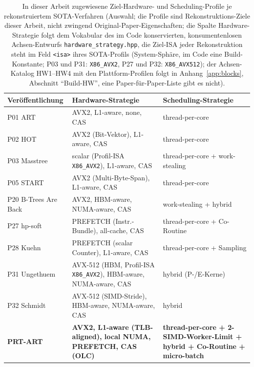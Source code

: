 \begin{nurlang}
\begin{table}[!htbp]
  \centering\small
  \caption{In dieser Arbeit zugewiesene Ziel-Hardware- und Scheduling-Profile je rekonstruiertem SOTA-Verfahren (Auswahl; die Profile sind Rekonstruktions-Ziele dieser Arbeit, nicht zwingend Original-Paper-Eigenschaften; die Spalte Hardware-Strategie folgt dem Vokabular des im Code konservierten, konsumentenlosen Achsen-Entwurfs \texttt{hardware\_strategy.hpp}, die Ziel-ISA jeder Rekonstruktion steht im Feld \texttt{<isa>} ihres SOTA-Profils (System-Sphäre, im Code eine Build-Konstante; P03 und P31: \texttt{X86\_AVX2}, P27 und P32: \texttt{X86\_AVX512}); der Achsen-Katalog HW1--HW4 mit den Plattform-Profilen folgt in Anhang~\ref{app:blocks}, Abschnitt \enquote{Build-HW}, eine Paper-für-Paper-Liste gibt es nicht).}\label{tab:hw-sched}
  \begin{tabular}{@{}l p{4.6cm} p{5.6cm}@{}}
    \toprule
    \textbf{Veröffentlichung} & \textbf{Hardware-Strategie} & \textbf{Scheduling-Strategie} \\
    \midrule
    P01 ART & AVX2, L1-aware, none, CAS & thread-per-core \\
    P02 HOT & AVX2 (Bit-Vektor), L1-aware, CAS & thread-per-core \\
    P03 Masstree & scalar (Profil-ISA \texttt{X86\_AVX2}), L1-aware, CAS & thread-per-core + work-stealing \\
    P05 START & AVX2 (Multi-Byte-Span), L1-aware, CAS & thread-per-core \\
    P20 B-Trees Are Back & AVX2, HBM-aware, NUMA-aware, CAS & work-stealing + hybrid \\
    P27 hp-soft & PREFETCH (Instr.-Bundle), all-cache, CAS & thread-per-core + Co-Routine \\
    P28 Kuehn & PREFETCH (scalar Counter), L1-aware, CAS & thread-per-core + Sampling \\
    P31 Ungethuem & AVX-512 (HBM, Profil-ISA \texttt{X86\_AVX2}), HBM-aware, NUMA-aware, CAS & hybrid (P-/E-Kerne) \\
    P32 Schmidt & AVX-512 (SIMD-Stride), HBM-aware, NUMA-aware, CAS & hybrid \\
    \midrule
    \textbf{PRT-ART} & \textbf{AVX2, L1-aware (TLB-aligned), local NUMA, PREFETCH, CAS (OLC)} & \textbf{thread-per-core + 2-SIMD-Worker-Limit + hybrid + Co-Routine + micro-batch} \\
    \bottomrule
  \end{tabular}
\end{table}
\end{nurlang}

